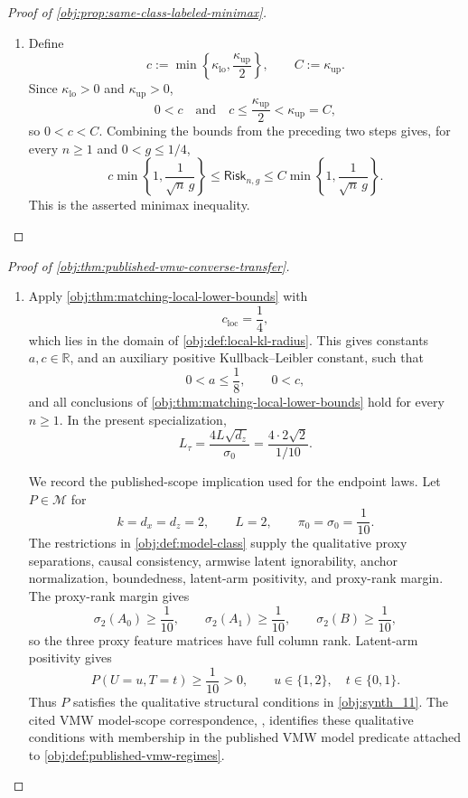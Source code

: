 \begin{proof}[Proof of \cref{obj:prop:same-class-labeled-minimax}]
\begin{enumerate}
\item Define
\[
c:=\min\left\{\kappa_{\mathrm{lo}},\frac{\kappa_{\mathrm{up}}}{2}\right\},
\qquad
C:=\kappa_{\mathrm{up}}.
\]
Since \(\kappa_{\mathrm{lo}}>0\) and \(\kappa_{\mathrm{up}}>0\),
\[
0<c
\quad\text{and}\quad
c\le\frac{\kappa_{\mathrm{up}}}{2}<\kappa_{\mathrm{up}}=C,
\]
so \(0<c<C\). Combining the bounds from the preceding two steps gives, for every \(n\ge1\) and \(0<g\le1/4\),
\[
c\min\left\{1,\frac{1}{\sqrt n\,g}\right\}
\le
\mathsf{Risk}_{n,g}
\le
C\min\left\{1,\frac{1}{\sqrt n\,g}\right\}.
\]
This is the asserted minimax inequality.
\end{enumerate}
\end{proof}

\begin{proof}[Proof of \cref{obj:thm:published-vmw-converse-transfer}]
\begin{enumerate}
\item Apply \cref{obj:thm:matching-local-lower-bounds} with
\[
c_{\mathrm{loc}}=\frac14,
\]
which lies in the domain of \cref{obj:def:local-kl-radius}.  This gives constants \(a,c\in\mathbb R\), and an auxiliary positive Kullback--Leibler constant, such that
\[
0<a\le \frac18,
\qquad
0<c,
\]
and all conclusions of \cref{obj:thm:matching-local-lower-bounds} hold for every \(n\ge1\).  In the present specialization,
\[
L_\tau
=\frac{4L\sqrt{d_z}}{\sigma_0}
=\frac{4\cdot2\sqrt2}{1/10}.
\]

We record the published-scope implication used for the endpoint laws.  Let \(P\in\mathcal M\) for
\[
k=d_x=d_z=2,\qquad L=2,\qquad \pi_0=\sigma_0=\frac1{10}.
\]
The restrictions in \cref{obj:def:model-class} supply the qualitative proxy separations, causal consistency, armwise latent ignorability, anchor normalization, boundedness, latent-arm positivity, and proxy-rank margin.  The proxy-rank margin gives
\[
\sigma_2(A_0)\ge \frac1{10},
\qquad
\sigma_2(A_1)\ge \frac1{10},
\qquad
\sigma_2(B)\ge \frac1{10},
\]
so the three proxy feature matrices have full column rank.  Latent-arm positivity gives
\[
P(U=u,T=t)\ge \frac1{10}>0,
\qquad
u\in\{1,2\},\quad t\in\{0,1\}.
\]
Thus \(P\) satisfies the qualitative structural conditions in \cref{obj:synth_11}.  The cited VMW model-scope correspondence, \citep[Assumptions 1--2 and Section 4.2]{VirkMazaheriWu2026}, identifies these qualitative conditions with membership in the published VMW model predicate attached to \cref{obj:def:published-vmw-regimes}.


\end{enumerate}
\end{proof}
